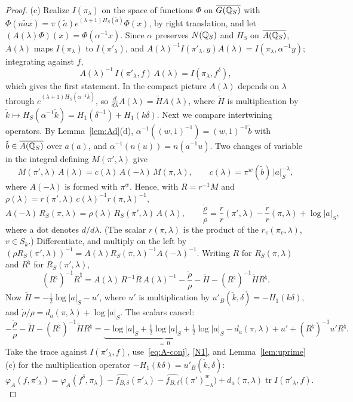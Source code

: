 \begin{proof}
(c) Realize $I(\pi_\lambda)$ on the space of functions $\Phi$ on $\overline{G(\mathbb{Q}_S)}$
with $\Phi(n\tilde ax)=\pi(\tilde a)e^{(\lambda+1)H_S(\tilde a)}\Phi(x)$,
by right translation, and let $(A(\lambda)\Phi)(x)=\Phi(\alpha^{-1}x)$.
Since $\alpha$ preserves $N(\mathbb{Q}_S)$ and $H_S$ on $\overline{A(\mathbb{Q}_S)}$, $A(\lambda)$ maps
$I(\pi_\lambda)$ to $I(\pi'_\lambda)$, and $A(\lambda)^{-1}I(\pi'_\lambda,
y)A(\lambda)=I(\pi_\lambda,\alpha^{-1}y)$; integrating against $f$,
\begin{equation}\label{eq:A-conj}
A(\lambda)^{-1}\,I(\pi'_\lambda,f)\,A(\lambda)=I(\pi_\lambda,f^\delta),
\end{equation}
which gives the first statement. In the compact picture $A(\lambda)$
depends on $\lambda$ through $e^{(\lambda+1)H_S(\alpha^{-1}\tilde k)}$, so
$\frac{d}{d\lambda}A(\lambda)=\tilde HA(\lambda)$, where $\tilde H$ is
multiplication by $\tilde k\mapsto H_S(\alpha^{-1}\tilde k)=H_1(\delta^{-1})
+H_1(k\delta)$. Next we compare intertwining operators. By
Lemma~\ref{lem:Ad}(d), $\alpha^{-1}((w,1)^{-1})=(w,1)^{-1}\tilde b$ with
$\tilde b\in\overline{A(\mathbb{Q}_S)}$ over $a(a)$, and $\alpha^{-1}(n(u))=n(a^{-1}u)$. Two
changes of variable in the integral defining $M(\pi',\lambda)$ give
\[
M(\pi',\lambda)\,A(\lambda)=c(\lambda)\,A(-\lambda)\,M(\pi,\lambda),
\qquad c(\lambda)=\pi^w(\tilde b)\,|a|_S^{-\lambda},
\]
where $A(-\lambda)$ is formed with $\pi^w$. Hence, with $R=r^{-1}M$ and
$\rho(\lambda)=r(\pi',\lambda)\,c(\lambda)^{-1}r(\pi,\lambda)^{-1}$,
\[
A(-\lambda)\,R_S(\pi,\lambda)=\rho(\lambda)\,R_S(\pi',\lambda)\,A(\lambda),
\qquad\frac{\dot\rho}{\rho}=\frac{\dot r}{r}(\pi',\lambda)-\frac{\dot r}{r}
(\pi,\lambda)+\log|a|_S ,
\]
where a dot denotes $d/d\lambda$. (The scalar $r(\pi,\lambda)$ is the product of the
$r_v(\pi_v,\lambda)$, $v\in S_k$.) Differentiate, and multiply on the left
by $(\rho R_S(\pi',\lambda))^{-1}=A(\lambda)R_S(\pi,\lambda)^{-1}
A(-\lambda)^{-1}$. Writing $R$ for $R_S(\pi,\lambda)$ and $R^\natural$ for
$R_S(\pi',\lambda)$,
\[
(R^\natural)^{-1}\dot R^\natural=A(\lambda)\,R^{-1}\dot R\,A(\lambda)^{-1}
-\frac{\dot\rho}{\rho}-\tilde H-(R^\natural)^{-1}\tilde HR^\natural .
\]
Now $\tilde H=-\frac12\log|a|_S-u'$, where $u'$ is multiplication by
$u'_B(\tilde k,\delta)=-H_1(k\delta)$, and $\dot\rho/\rho=d_a(\pi,\lambda)+
\log|a|_S$. The scalars cancel:
\[
-\frac{\dot\rho}{\rho}-\tilde H-(R^\natural)^{-1}\tilde HR^\natural
=\underbrace{-\log|a|_S+\tfrac12\log|a|_S+\tfrac12\log|a|_S}_{=\,0}
-d_a(\pi,\lambda)+u'+(R^\natural)^{-1}u'R^\natural .
\]
Take
the trace against $I(\pi'_\lambda,f)$, use~\eqref{eq:A-conj},
\ref{N1}, and Lemma~\ref{lem:uprime}(c) for the multiplication operator
$-H_1(k\delta)=u'_B(\tilde k,\delta)$:
\[
\varphi_A(f,\pi'_\lambda)=\varphi_A(f^\delta,\pi_\lambda)-
\widehat{f_{B,\delta}}(\pi'_\lambda)-\widehat{f_{B,\delta}}\bigl((\pi')^w_{
-\lambda}\bigr)+d_a(\pi,\lambda)\operatorname{tr}I(\pi'_\lambda,f).
\]


\end{proof}
